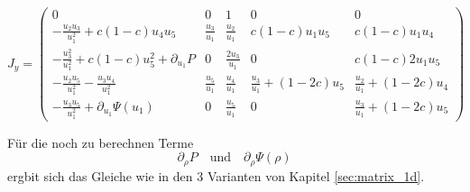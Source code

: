 \begin{equation}
J_y = \left(\begin{array}{ccccc}
  0 & 0 & 1 & 0 & 0\\
 - \frac{u_2u_3}{u_1^2} +  c (1-c) u_4 u_5 & \frac{u_3}{u_1}  & \frac{u_2}{u_1} &
 c (1-c) u_1 u_5 & c (1-c)  u_1 u_4 \\
 - \frac{u_3^2}{u_1^2} + c(1-c) u_5^2 + \partial_{u_1} P & 0 & \frac{2 u_3}{u_1} & 0 &  
 c (1-c) 2 u_1 u_5  \\
- \frac{u_2 u_5}{u_1^2} - \frac{u_3 u_4}{u_1^2} & \frac{u_5}{u_1} &
\frac{u_4}{u_1} & \frac{u_3}{u_1} + (1-2c) u_{5} & \frac{u_2}{u_1} + (1-2c)u_{4}\\
- \frac{u_3 u_5}{u_1^2} + \partial_{u_1} \Psi(u_1) &  0 & \frac{u_5}{u_1}  & 0 &
 \frac{u_3}{u_1} + (1-2c) u_5 
\end{array}\right)\qquad\label{eq:jacobi_y_2d_allgemein}
\end{equation}


Für die noch zu berechnen Terme
\[
\partial_{\rho} P\quad\mbox{und}\quad \partial_{\rho} \Psi(\rho)
\]
ergbit sich das Gleiche wie in den 3 Varianten von Kapitel
\ref{sec:matrix_1d}.
